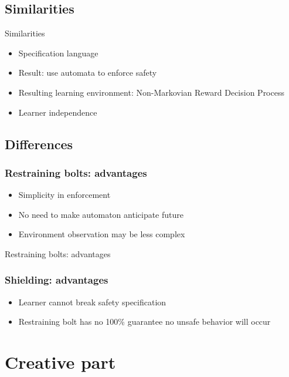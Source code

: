 \documentclass[kul]{kulakbeamer}
\begin{document}
\subsection{Similarities}
\begin{frame}{Similarities}
    \begin{itemize}
        \item Specification language
        \item Result: use automata to enforce safety
        \item Resulting learning environment: Non-Markovian Reward Decision Process
        \item Learner independence
    \end{itemize}
\end{frame}
\subsection{Differences}

\begin{frame}
\frametitle{Restraining bolts: advantages}
\begin{itemize}
    \item Simplicity in enforcement
    \item No need to make automaton anticipate future
    \item Environment observation may be less complex
\end{itemize}
\end{frame}
\begin{frame}{Restraining bolts: advantages}
   \begin{figure}
    \centering
    \def\svgwidth{.8\columnwidth}
    \footnotemark
\end{figure}
\end{frame}
\begin{frame}
\frametitle{Shielding: advantages}
    \begin{itemize}
        \item Learner cannot break safety specification
        \item Restraining bolt has no 100\% guarantee no unsafe behavior will occur
    \end{itemize}
\end{frame}

\section{Creative part}
\end{document}
